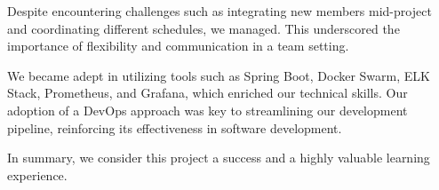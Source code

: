 Despite encountering challenges such as integrating new members mid-project and coordinating different schedules, we managed. This underscored the importance of flexibility and communication in a team setting.

We became adept in utilizing tools such as Spring Boot, Docker Swarm, ELK Stack, Prometheus, and Grafana, which enriched our technical skills. Our adoption of a DevOps approach was key to streamlining our development pipeline, reinforcing its effectiveness in software development.

In summary, we consider this project a success and a highly valuable learning experience.  


